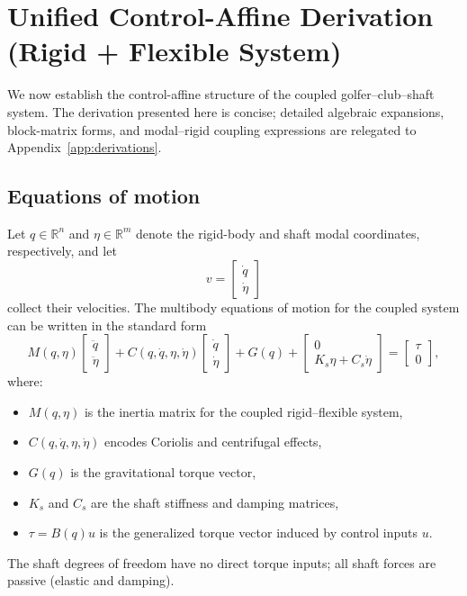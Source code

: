\documentclass[12pt]{article}
\newcommand{\R}{\mathbb{R}}
\newcommand{\qd}{\dot{q}}
\newcommand{\qdd}{\ddot{q}}
\newcommand{\etad}{\dot{\eta}}
\newcommand{\etadd}{\ddot{\eta}}
\begin{document}
\section{Unified Control-Affine Derivation (Rigid + Flexible System)}
\label{sec:affine}

We now establish the control-affine structure of the coupled golfer--club--shaft system. The derivation presented here is concise; detailed algebraic expansions, block-matrix forms, and modal--rigid coupling expressions are relegated to Appendix~\ref{app:derivations}.

\subsection{Equations of motion}

Let \(q \in \R^{n}\) and \(\eta \in \R^{m}\) denote the rigid-body and shaft modal coordinates, respectively, and let
\[
  v = \begin{bmatrix} \qd \\ \etad \end{bmatrix}
\]
collect their velocities. The multibody equations of motion for the coupled system can be written in the standard form
\begin{equation}
  M(q,\eta)
  \begin{bmatrix}
    \qdd \\[0.2em]
    \etadd
  \end{bmatrix}
  +
  C(q,\qd,\eta,\etad)
  \begin{bmatrix}
    \qd \\[0.2em]
    \etad
  \end{bmatrix}
  + G(q) + 
  \begin{bmatrix}
    0 \\[0.2em]
    K_{s}\eta + C_{s}\etad
  \end{bmatrix}
  =
  \begin{bmatrix}
    \tau \\[0.2em]
    0
  \end{bmatrix},
  \label{eq:eom_block}
\end{equation}
where:
\begin{itemize}
  \item \(M(q,\eta)\) is the inertia matrix for the coupled rigid--flexible system,
  \item \(C(q,\qd,\eta,\etad)\) encodes Coriolis and centrifugal effects,
  \item \(G(q)\) is the gravitational torque vector,
  \item \(K_{s}\) and \(C_{s}\) are the shaft stiffness and damping matrices,
  \item \(\tau = B(q) u\) is the generalized torque vector induced by control inputs \(u\).
\end{itemize}
The shaft degrees of freedom have no direct torque inputs; all shaft forces are passive (elastic and damping).
\end{document}
